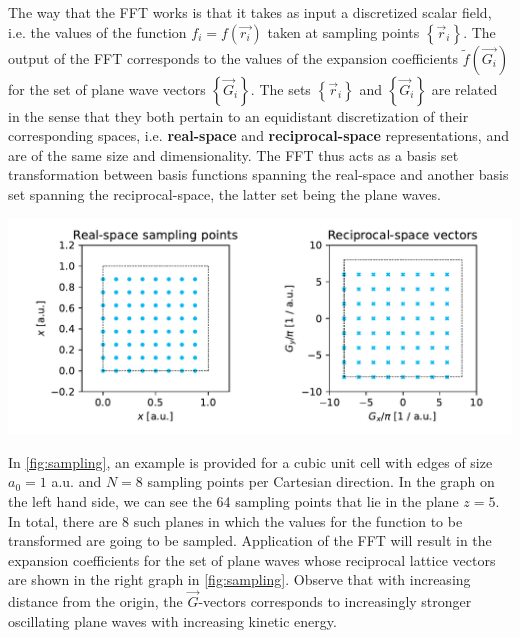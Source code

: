 The way that the FFT works is that it takes as input a discretized scalar field, i.e. the values of the function $f_{i} = f(\vec{r_{i}})$ taken at sampling points $\left\{\vec{r}_{i}\right\}$. The output of the FFT corresponds to the values of the expansion coefficients $\tilde{f}(\vec{G_{i}})$ for the set of plane wave vectors $\left\{ \vec{G}_{i} \right\}$. The sets $\left\{\vec{r}_{i}\right\}$ and $\left\{\vec{G}_{i}\right\}$ are related in the sense that they both pertain to an equidistant discretization of their corresponding spaces, i.e. \textbf{real-space} and \textbf{reciprocal-space} representations, and are of the same size and dimensionality. The FFT thus acts as a basis set transformation between basis functions spanning the real-space and another basis set spanning the reciprocal-space, the latter set being the plane waves.

\begin{Figure}
    \centering
    \includegraphics[width=\linewidth]{img/fig2_sampling.pdf}
    \label{fig:sampling}
\end{Figure}

In \cref{fig:sampling}, an example is provided for a cubic unit cell with edges of size $a_{0} = 1$ a.u. and $N = 8$ sampling points per Cartesian direction. In the graph on the left hand side, we can see the 64 sampling points that lie in the plane $z=5$. In total, there are 8 such planes in which the values for the function to be transformed are going to be sampled. Application of the FFT will result in the expansion coefficients for the set of plane waves whose reciprocal lattice vectors are shown in the right graph in \cref{fig:sampling}. Observe that with increasing distance from the origin, the $\vec{G}$-vectors corresponds to increasingly stronger oscillating plane waves with increasing kinetic energy.

